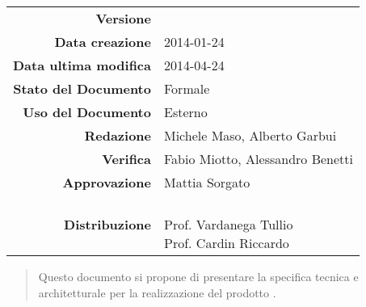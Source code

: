 


\newcommand{\Versione}{\versioneSpecificaTecnica{}}	  %
\newcommand{\Data}{2014-01-24}				           %
\newcommand{\DataUltimaModifica}{2014-04-24}
\newcommand{\TipoDocumento}{Specifica Tecnica}	       %



\begin{center}
\begin{tabular}{r|l}
\textbf{Versione} & \Versione{} \\
\textbf{Data creazione} & \Data{} \\
\textbf{Data ultima modifica} & \DataUltimaModifica{} \\
\textbf{Stato del Documento} & Formale \\		          %
\textbf{Uso del Documento} & Esterno \\			          %
\textbf{Redazione} &  Michele Maso, Alberto Garbui\\	  %
\textbf{Verifica} & Fabio Miotto, Alessandro Benetti\\  %
\textbf{Approvazione} & Mattia Sorgato\\			      %
\textbf{Distribuzione} & \parbox[t]{4cm}{\NomeGruppo{}\\Prof. Vardanega Tullio\\Prof. Cardin Riccardo\\ \Prop{} }\\
\end{tabular}
\end{center}

\vspace{0.05in}

\begin{abstract}
\begin{center}
Questo documento si propone di presentare la specifica tecnica e architetturale per la realizzazione del prodotto \Progetto{}.
\end{center}
\end{abstract}

